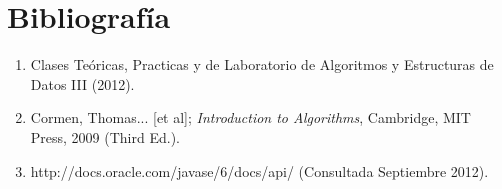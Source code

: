 \section{Bibliografía}

\begin{enumerate}
	\item Clases Teóricas, Practicas y de Laboratorio de Algoritmos y Estructuras de Datos III (2012).
	\item Cormen, Thomas... [et al]; \textit{Introduction to Algorithms}, Cambridge, MIT Press, 2009 (Third Ed.).
	\item http://docs.oracle.com/javase/6/docs/api/ (Consultada Septiembre 2012).
\end{enumerate}
